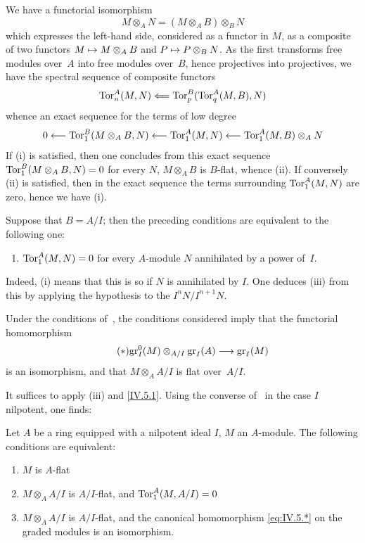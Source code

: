 We have a functorial isomorphism
$$
M \otimes_A N = (M \otimes_A B) \otimes_B N
$$
which expresses the left-hand side, considered as a functor in
$M$, as a composite of two functors $M \mto M \otimes_A B$
and $P \mto P \otimes_B N$. As the first transforms free
modules over~$A$ into free modules over~$B$, hence projectives into
projectives, we have the spectral sequence of composite functors
$$
\Tor_n^A(M,N) \From \Tor_p^B(\Tor_q^A(M,B),N)
$$
whence an exact sequence for the terms of low degree
$$
0 \from \Tor_1^B(M \otimes_A B,N) \from \Tor_1^A(M,N)
\from \Tor_1^A(M,B) \otimes_A N
$$
If (i) is satisfied, then one concludes from this exact sequence
$\operatorname{Tor}_1^B(M \otimes_A B,N) = 0$ for every $N$, \ie $M \otimes_A B$
is $B$-flat, whence (ii). If conversely (ii) is satisfied,
then in the exact sequence the terms surrounding $\operatorname{Tor}_1^A(M,N)$ are
zero, hence we have (i).

\begin{corollary}
\label{IV.5.3}
Suppose that $B = A/I$; then the preceding conditions
are equivalent to the following one:
\begin{enumerate}
\item[(iii)] $\operatorname{Tor}_1^A(M,N) = 0$ for every $A$-module $N$ annihilated
by a power of~$I$.
\end{enumerate}
\end{corollary}

Indeed, (i) means that this is so if $N$ is annihilated by
$I$. One deduces (iii) from this by applying the hypothesis to the
$I^nN/I^{n+1}N$.

\begin{corollary}
\label{IV.5.4}
Under the conditions of~, the conditions considered
imply that
the functorial ho\-mo\-mor\-phism
\begin{equation*}
\label{eq:IV.5.*}
\tag{$*$} {\gr_I^0(M) \otimes_{A/I} \gr_I(A) \to \gr_I(M)}
\end{equation*}
is an isomorphism, and that $M \otimes_A A/I$ is flat over~$A/I$.
\end{corollary}

It suffices to apply (iii) and \eqref{IV.5.1}. Using the
converse of~ in the case $I$ nilpotent, one finds:
\begin{corollary}
\label{IV.5.5}
Let $A$ be a ring equipped with a nilpotent ideal $I$, $M$ an
$A$-module. The following conditions are equivalent:
\begin{enumerate}
\item[(i)] $M$ is $A$-flat
\item[(ii)] $M \otimes_A A/I$ is $A/I$-flat, and $\operatorname{Tor}_1^A(M,A/I) = 0$
\item[(iii)] $M \otimes_A A/I$ is $A/I$-flat, and the canonical
homomorphism \eqref{eq:IV.5.*} on the graded modules is an isomorphism.
\end{enumerate}
\end{corollary}

